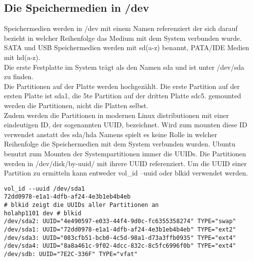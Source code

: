 \documentclass[10pt,paper=a4,final]{scrartcl}
\begin{document}
\subsection{Die Speichermedien in /dev}
Speichermedien werden in /dev mit einem Namen referenziert der sich darauf bezieht in welcher Reihenfolge das Medium mit dem System verbunden wurde.
SATA und USB Speichermedien werden mit sd(a-z) benannt, PATA/IDE Medien mit hd(a-z).\\
Die erste Festplatte im System tr\"agt als den Namen sda und ist unter /dev/sda zu finden.\\
Die Partitionen auf der Platte werden hochgez\"ahlt. Die erste Partition auf der ersten Platte ist sda1, die 5te Partition auf der dritten Platte sdc5. gemounted werden die Partitionen, nicht die Platten selbst.\\
Zudem werden die Partitionen in modernen Linux distributionen mit einer eindeutigen ID, der sogenannten UUID, bezeichnet. Wird zum mounten diese ID verwendet anstatt des sda/hda Namens spielt es keine Rolle in welcher Reihenfolge die Speichermedien mit dem System verbunden wurden. Ubuntu benutzt zum Mounten der Systempartitionen immer die UUIDs. Die Partitionen werden in /dev/disk/by-uuid/ mit ihrere UUID referenziert. Um die UUID einer Partition zu ermitteln kann entweder vol\_id --uuid oder blkid verwendet werden.
\begin{lstlisting}[frame=single]
vol_id --uuid /dev/sda1
72dd0978-e1a1-4dfb-af24-4e3b1eb4b4eb
# blkid zeigt die UUIDs aller Partitionen an
holahp1101 dev # blkid 
/dev/sda2: UUID="4e490597-e033-44f4-9d0c-fc6355358274" TYPE="swap" 
/dev/sda1: UUID="72dd0978-e1a1-4dfb-af24-4e3b1eb4b4eb" TYPE="ext2" 
/dev/sda3: UUID="083cfb51-bcb0-4c5d-98a1-d73a3ffb0935" TYPE="ext4" 
/dev/sda4: UUID="8a8a461c-9f02-4dcc-832c-8c5fc6996f0b" TYPE="ext4" 
/dev/sdb: UUID="7E2C-336F" TYPE="vfat" 
\end{lstlisting}
\end{document}
